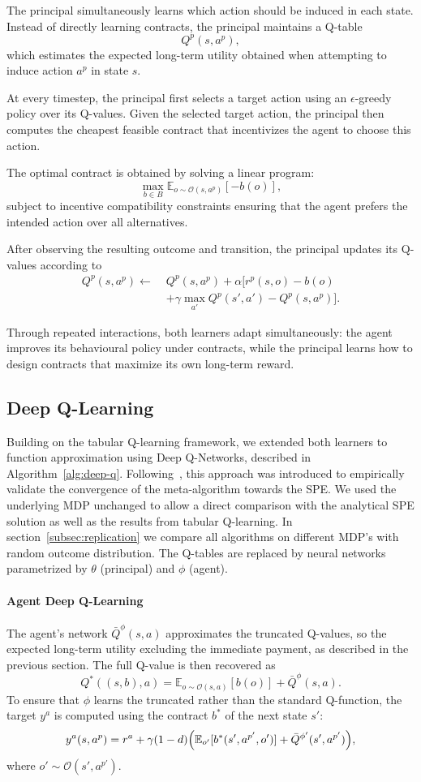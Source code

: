 \documentclass{article}
\theoremstyle{plain}
\theoremstyle{definition}
\theoremstyle{remark}
\begin{document}
The principal simultaneously learns which action should be induced in each state.
Instead of directly learning contracts, the principal maintains a Q-table
\[
Q^{p}(s,a^{p}),
\]
which estimates the expected long-term utility obtained when attempting to induce action $a^{p}$ in state $s$.

At every timestep, the principal first selects a target action using an $\epsilon$-greedy policy over its Q-values.
Given the selected target action, the principal then computes the cheapest feasible contract that incentivizes the agent to choose this action.

The optimal contract is obtained by solving a linear program:
\[
\max_{b \in B}
\mathbb{E}_{o \sim \mathcal{O}(s,a^{p})}[-b(o)],
\]
subject to incentive compatibility constraints ensuring that the agent prefers the intended action over all alternatives.

After observing the resulting outcome and transition, the principal updates its Q-values according to
\[
\begin{aligned}
Q^{p}(s,a^{p})
\leftarrow\;&
Q^{p}(s,a^{p})
+
\alpha
\Big[
r^{p}(s,o)-b(o)
\\
&+
\gamma \max_{a'} Q^{p}(s',a')
-
Q^{p}(s,a^{p})
\Big].
\end{aligned}
\]

Through repeated interactions, both learners adapt simultaneously:
the agent improves its behavioural policy under contracts, while the principal learns how to design contracts that maximize its own long-term reward.

\subsection{Deep Q-Learning}
Building on the tabular Q-learning framework, we extended both learners to function approximation using Deep Q-Networks, described in Algorithm~\ref{alg:deep-q}. Following~\cite{ivanov2024principal}, this approach was introduced to 
empirically validate the convergence of the meta-algorithm towards the SPE. 
We used the underlying MDP unchanged to allow a direct comparison with the analytical SPE solution as well as the results from tabular Q-learning. In section~\ref{subsec:replication} we compare all algorithms on different MDP's with random outcome distribution. 
The Q-tables are replaced by neural networks parametrized by $\theta$ (principal) and $\phi$ (agent). 

\paragraph{Agent Deep Q-Learning}
The agent's network $\bar{Q}^{\phi}(s,a)$ approximates the truncated 
Q-values, so the expected long-term utility excluding the immediate payment, as described in the previous section.  The full Q-value is then recovered as
\[
Q^{*}((s,b),a) = \mathbb{E}_{o \sim \mathcal{O}(s,a)}[b(o)] 
+ \bar{Q}^{\phi}(s,a).
\]
To ensure that $\phi$ learns the truncated rather than the standard Q-function, the target $y^a$ is computed using the contract $b^*$ of the next state $s'$:
\[
y^{a}(s,a^{p}) = r^{a} + \gamma(1-d)
\Bigl(
\mathbb{E}_{o'}[b^{*}(s',a^{p'},o')]
+\bar{Q}^{\phi'}(s',a^{p'})
\Bigr),
\]
where $o' \sim \mathcal{O}(s',a^{p'})$.
\end{document}
